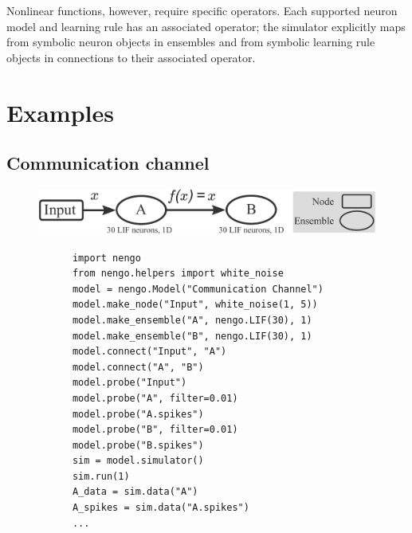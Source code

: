 \documentclass{frontiersSCNS}
\begin{document}
Nonlinear functions, however,
require specific operators.
Each supported neuron model and learning rule
has an associated operator;
the simulator explicitly maps
from symbolic neuron objects in ensembles
and from symbolic learning rule objects
in connections to their associated operator.

\section{Examples} \label{sec:examples}

\subsection{Communication channel} \label{sec:comm-channel}

\begin{figure}
\begin{center}
  \includegraphics[width=.9\textwidth]{comm_channel}
  \begin{minipage}{0.58\textwidth}
    \begin{lstlisting}
      import nengo
      from nengo.helpers import white_noise
      model = nengo.Model("Communication Channel")
      model.make_node("Input", white_noise(1, 5))
      model.make_ensemble("A", nengo.LIF(30), 1)
      model.make_ensemble("B", nengo.LIF(30), 1)
      model.connect("Input", "A")
      model.connect("A", "B")
      model.probe("Input")
      model.probe("A", filter=0.01)
      model.probe("A.spikes")
      model.probe("B", filter=0.01)
      model.probe("B.spikes")
      sim = model.simulator()
      sim.run(1)
      A_data = sim.data("A")
      A_spikes = sim.data("A.spikes")
      ...
    \end{lstlisting}
  \end{minipage}
  \begin{minipage}{0.37\textwidth}

\end{minipage}
\end{center}
\end{figure}
\end{document}
